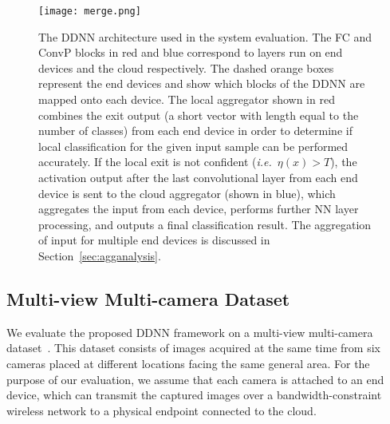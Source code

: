 \documentclass[10pt, conference, compsocconf]{IEEEtran}
\newcommand{\ie}{\emph{i.e.}}
\begin{document}
\begin{figure}
    \centering
    \texttt{[image: merge.png]}
    \caption{The DDNN architecture used in the system evaluation. The FC and ConvP blocks in red and blue correspond to layers run on end devices and the cloud respectively. The dashed orange boxes represent the end devices and show which blocks of the DDNN are mapped onto each device. The local aggregator shown in red combines the exit output (a short vector with length equal to the number of classes) from each end device in order to determine if local classification for the given input sample can be performed accurately. If the local exit is not confident (\ie~$\eta(x) > T$), the activation output after the last convolutional layer from each end device is sent to the cloud aggregator (shown in blue), which aggregates the input from each device, performs further NN layer processing, and outputs a final classification result. The aggregation of input for multiple end devices is discussed in Section~\ref{sec:agganalysis}.}
    \label{fig:merge}
\end{figure}


\subsection{Multi-view Multi-camera Dataset}
\label{sec:dataset}
We evaluate the proposed DDNN framework on a multi-view multi-camera dataset~\cite{roig2011conditional}. This dataset consists of images acquired at the same time from six cameras placed at different locations facing the same general area. For the purpose of our evaluation, we assume that each camera is attached to an end device, which can transmit the captured images over a bandwidth-constraint wireless network to a physical endpoint connected to the cloud. 
\end{document}
